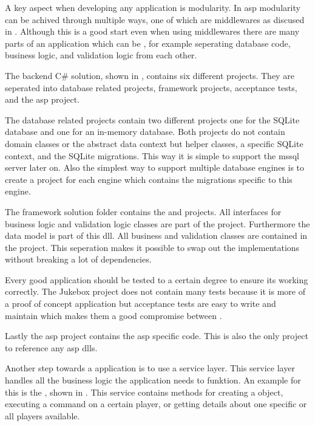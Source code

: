 A key aspect when developing any application is modularity. In \gls{asp} modularity can be achived through multiple ways, one of which are middlewares as discused in . Although this is a good start even when using middlewares there are many parts of an application which can be , for example seperating database code, business logic, and validation logic from each other.


The backend C\# solution, shown in , contains six different projects. They are seperated into database related projects, framework projects, acceptance tests, and the \gls{asp} project.

The database related projects contain two different projects one for the SQLite database and one for an in-memory database. Both projects do not contain domain classes or the abstract data context but helper classes, a specific SQLite context, and the SQLite migrations. This way it is simple to support \zB the \gls{mssql} server later on. Also the simplest way to support multiple database engines is to create a project for each engine which contains the migrations specific to this engine.

The framework solution folder contains the  and  projects. All interfaces for business logic and validation logic classes are part of the  project. Furthermore the data model is part of this \gls{dll}. All business and validation classes are contained in the  project. This seperation makes it possible to swap out the implementations without breaking a lot of dependencies.

Every good application should be tested to a certain degree to ensure its working correctly. The Jukebox project does not contain many tests because it is more of a proof of concept application but acceptance tests are easy to write and maintain which makes them a good compromise between .

Lastly the \gls{asp} project contains the \gls{asp} specific code. This is also the only project to reference any \gls{asp} \glspl{dll}.



Another step towards a  application is to use a service layer. This service layer handles all the business logic the application needs to funktion. An example for this is the , shown in . This service contains methods for creating a  object, executing a command on a certain player, or getting details about one specific or all players available.

